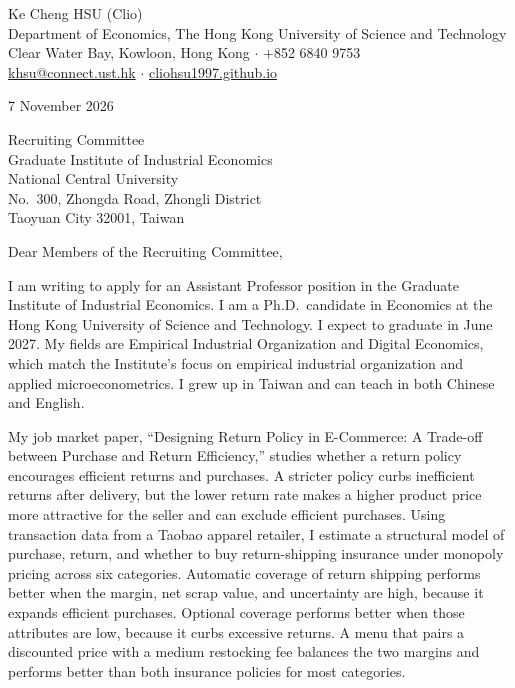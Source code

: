 \documentclass[11pt]{article}
\begin{document}
\begin{flushleft}
Ke Cheng HSU (Clio) \\
Department of Economics, The Hong Kong University of Science and Technology \\
Clear Water Bay, Kowloon, Hong Kong $\cdot$ +852 6840 9753 \\
\href{mailto:khsu@connect.ust.hk}{khsu@connect.ust.hk} $\cdot$ \href{https://cliohsu1997.github.io/}{cliohsu1997.github.io}
\end{flushleft}

7 November 2026

\vspace{0.12em}
Recruiting Committee \\
Graduate Institute of Industrial Economics \\
National Central University \\
No.\ 300, Zhongda Road, Zhongli District \\
Taoyuan City 32001, Taiwan

\vspace{0.12em}
Dear Members of the Recruiting Committee,

I am writing to apply for an Assistant Professor position in the Graduate Institute of Industrial Economics. I am a Ph.D.\ candidate in Economics at the Hong Kong University of Science and Technology. I expect to graduate in June 2027. My fields are Empirical Industrial Organization and Digital Economics, which match the Institute's focus on empirical industrial organization and applied microeconometrics. I grew up in Taiwan and can teach in both Chinese and English.

My job market paper, ``Designing Return Policy in E-Commerce: A Trade-off between Purchase and Return Efficiency,'' studies whether a return policy encourages efficient returns and purchases. A stricter policy curbs inefficient returns after delivery, but the lower return rate makes a higher product price more attractive for the seller and can exclude efficient purchases. Using transaction data from a Taobao apparel retailer, I estimate a structural model of purchase, return, and whether to buy return-shipping insurance under monopoly pricing across six categories. Automatic coverage of return shipping performs better when the margin, net scrap value, and uncertainty are high, because it expands efficient purchases. Optional coverage performs better when those attributes are low, because it curbs excessive returns. A menu that pairs a discounted price with a medium restocking fee balances the two margins and performs better than both insurance policies for most categories.
\end{document}
